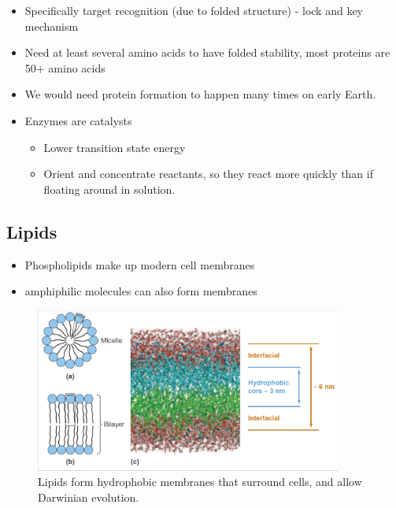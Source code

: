 \documentclass[]{article}
\begin{document}
\begin{itemize}
	\item  Specifically target recognition (due to folded
	structure) - lock and key mechanism
	\item  Need at least several amino acids to have
	folded stability, most proteins are 50+ amino
	acids
	\item We would need protein formation to happen many times on early Earth.
	\item Enzymes are catalysts
	\begin{itemize}
		\item Lower transition state energy
		\item Orient and concentrate reactants, so they react more quickly than if floating around in solution.
	\end{itemize}
\end{itemize}



\subsection{Lipids}
\cite[14.2 Lipids \& Triglycerides]{brown2009chemistry}

\begin{itemize}
	\item Phospholipids make up modern cell
	membranes
	\item amphiphilic molecules can also form
	membranes
\end{itemize}

\begin{figure}[H]
	\caption{Lipids form hydrophobic membranes that surround cells, and allow Darwinian evolution.}\label{fig:Lipids} 
	\includegraphics[width=0.9\textwidth]{Lipids}
\end{figure}
\end{document}
